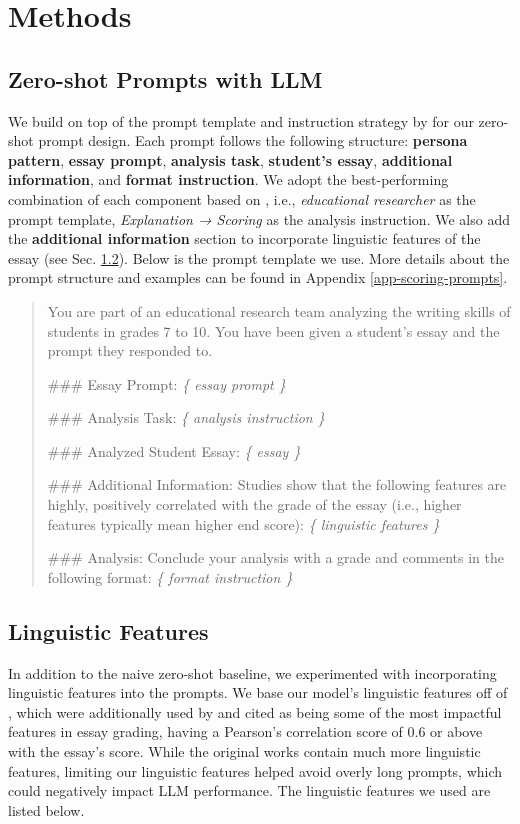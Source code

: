 \section{Methods}
\label{methods}
\subsection{Zero-shot Prompts with LLM}
We build on top of the prompt template and instruction strategy by \cite{stahl-etal-2024-exploring} for our zero-shot prompt design. Each prompt follows the following structure: \textbf{persona pattern}, \textbf{essay prompt}, \textbf{analysis task}, \textbf{student's essay}, \textbf{additional information}, and \textbf{format instruction}. We adopt the best-performing combination of each component based on \cite{stahl-etal-2024-exploring}, i.e., \textit{educational researcher} as the prompt template, \textit{Explanation → Scoring} as the analysis instruction. We also add the \textbf{additional information} section to incorporate linguistic features of the essay (see Sec. \ref{linguistic-features-2}). Below is the prompt template we use. More details about the prompt structure and examples can be found in Appendix \ref{app-scoring-prompts}.
\begin{center}
\footnotesize
\begin{quote}
You are part of an educational research team analyzing the writing skills of students in grades 7 to 10. You have been given a student's essay and the prompt they responded to.

\#\#\# Essay Prompt: \textit{\{ essay prompt \}}

\#\#\# Analysis Task: \textit{\{ analysis instruction \}}

\#\#\# Analyzed Student Essay: \textit{\{ essay \}}

\#\#\# Additional Information: Studies show that the following features are highly, positively correlated with the grade of the essay (i.e., higher features typically mean higher end score): \textit{\{ linguistic features \}}

\#\#\# Analysis: Conclude your analysis with a grade and comments in the following format: \textit{\{ format instruction \}}
\end{quote}
\end{center}

\subsection{Linguistic Features}
\label{linguistic-features-2}
In addition to the naive zero-shot baseline, we experimented with incorporating linguistic features into the prompts. We base our model's linguistic features off of \cite{ridleyPromptAgnosticEssay2020}, which were additionally used by \cite{li-ng-2024-conundrums} and cited as being some of the most impactful features in essay grading, having a Pearson's correlation score of 0.6 or above with the essay's score. While the original works contain much more linguistic features, limiting our linguistic features helped avoid overly long prompts, which could negatively impact LLM performance. The linguistic features we used are listed below.

